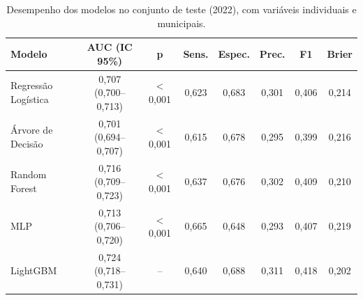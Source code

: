 \begin{table}[H]
    \centering
    \caption{Desempenho dos modelos no conjunto de teste (2022), com variáveis individuais e municipais.}
    \label{tab-res-desempenho}
    \footnotesize
    \renewcommand{\arraystretch}{1.2}
    \setlength{\tabcolsep}{4pt}
    \begin{tabular}{l c c c c c c c}
        \hline
        \textbf{Modelo} & \textbf{AUC (IC 95\%)} & \textbf{p} & \textbf{Sens.} & \textbf{Espec.} & \textbf{Prec.} & \textbf{F1} & \textbf{Brier} \\
        \hline
        Regressão Logística & 0,707 (0,700–0,713) & < 0,001 & 0,623 & 0,683 & 0,301 & 0,406 & 0,214 \\
        Árvore de Decisão & 0,701 (0,694–0,707) & < 0,001 & 0,615 & 0,678 & 0,295 & 0,399 & 0,216 \\
        Random Forest & 0,716 (0,709–0,723) & < 0,001 & 0,637 & 0,676 & 0,302 & 0,409 & 0,210 \\
        MLP & 0,713 (0,706–0,720) & < 0,001 & 0,665 & 0,648 & 0,293 & 0,407 & 0,219 \\
        LightGBM & 0,724 (0,718–0,731) & -- & 0,640 & 0,688 & 0,311 & 0,418 & 0,202 \\
        \hline
    \end{tabular}
\end{table}
